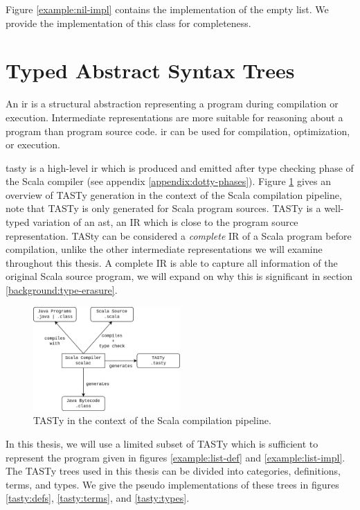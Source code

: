 Figure \ref{example:nil-impl} contains the implementation of the empty list. 
We provide the implementation of this class for completeness.


\section{Typed Abstract Syntax Trees}

An \acrfull{ir} is a structural abstraction representing a program during compilation or execution. 
Intermediate representations are more suitable for reasoning about a program than program source code. 
\acrshort{ir} can be used for compilation\cite{llvm}, optimization\cite{llvm}\cite{ssa}, or execution\cite{java:vm-spec}\cite{clr:spec}.

\acrfull{tasty} is a high-level \acrfull{ir} which is produced and emitted after type checking phase of the Scala compiler (see appendix \ref{appendix:dotty-phases}).
Figure \ref{system:tasty} gives an overview of TASTy generation in the context of the Scala compilation pipeline, note that TASTy is only generated for Scala program sources.
TASTy is a well-typed variation of an \acrfull{ast}, an IR which is close to the program source representation.
TASty can be considered a \textit{complete} IR of a Scala program before compilation, unlike the other intermediate representations we will examine throughout this thesis.
A complete IR is able to capture all information of the original Scala source program, we will expand on why this is significant in section \ref{background:type-erasure}.

\begin{figure}[H]
	\centering
	\includegraphics[width=0.5\textwidth]{figures/scala-pipeline.png}
	\caption{TASTy in the context of the Scala compilation pipeline.}
	\label{system:tasty}
\end{figure}

In this thesis, we will use a limited subset of TASTy which is sufficient to represent the program given in figures \ref{example:list-def} and \ref{example:list-impl}.
The TASTy trees used in this thesis can be divided into categories, definitions, terms, and types. 
We give the pseudo implementations of these trees in figures \ref{tasty:defs}, \ref{tasty:terms}, and \ref{tasty:types}.

